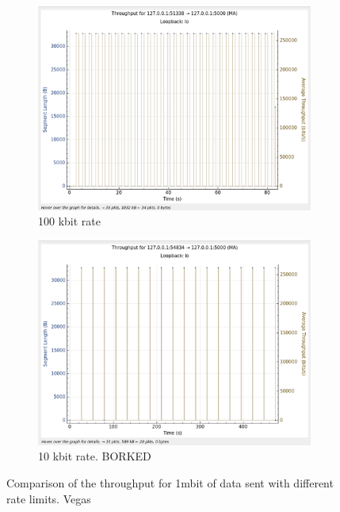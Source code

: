 \documentclass{report}
\begin{document}
\begin{figure}[H]
    \begin{subfigure}[b]{0.45\textwidth}
        \centering
        \includegraphics[width=\textwidth]{Pics/Vegas/r100kbit_s1m_th}
        \caption{100 kbit rate}
    \end{subfigure}
    \hfill
    \begin{subfigure}[b]{0.45\textwidth}
        \centering
        \includegraphics[width=\textwidth]{Pics/Vegas/r10kbit_s1m_th}
        \caption{10 kbit rate. BORKED}
    \end{subfigure}
    \caption{Comparison of the throughput for 1mbit of data sent with different rate limits. Vegas}
    \label{fig:four_images}
\end{figure}
\end{document}
